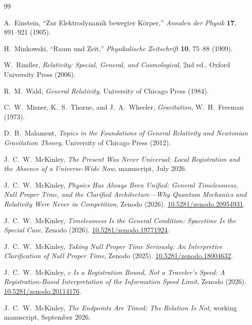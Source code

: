 \documentclass[12pt,onecolumn]{article}
\newcommand{\doi}[1]{\href{https://doi.org/#1}{#1}}
\begin{document}
\begin{thebibliography}{99}

A.~Einstein,
``Zur Elektrodynamik bewegter K\"orper,''
\emph{Annalen der Physik} \textbf{17},
891--921 (1905).

H.~Minkowski,
``Raum und Zeit,''
\emph{Physikalische Zeitschrift} \textbf{10},
75--88 (1909).

W.~Rindler,
\emph{Relativity: Special, General, and Cosmological},
2nd ed.,
Oxford University Press (2006).

R.~M.~Wald,
\emph{General Relativity},
University of Chicago Press (1984).

C.~W.~Misner, K.~S.~Thorne, and J.~A.~Wheeler,
\emph{Gravitation},
W.~H.~Freeman (1973).

D.~B.~Malament,
\emph{Topics in the Foundations of General Relativity and Newtonian Gravitation Theory},
University of Chicago Press (2012).

J.~C.~W.~McKinley,
\emph{The Present Was Never Universal:
Local Registration and the Absence of a Universe-Wide Now},
manuscript, July 2026.

J.~C.~W.~McKinley,
\emph{Physics Has Always Been Unified:
General Timelessness, Null Proper Time,
and the Clarified Architecture---Why Quantum Mechanics
and Relativity Were Never in Competition},
Zenodo (2026).
\doi{10.5281/zenodo.20954931}.

J.~C.~W.~McKinley,
\emph{Timelessness Is the General Condition:
Spacetime Is the Special Case},
Zenodo (2026).
\doi{10.5281/zenodo.19771924}.

J.~C.~W.~McKinley,
\emph{Taking Null Proper Time Seriously:
An Interpretive Clarification of Null Proper Time},
Zenodo (2025).
\doi{10.5281/zenodo.18004632}.

J.~C.~W.~McKinley,
\emph{c Is a Registration Bound, Not a Traveler's Speed:
A Registration-Based Interpretation of the Information Speed Limit},
Zenodo (2026).
\doi{10.5281/zenodo.20114176}.

J.~C.~W.~McKinley,
\emph{The Endpoints Are Timed; The Relation Is Not},
working manuscript, September 2026.

\end{thebibliography}
\end{document}
